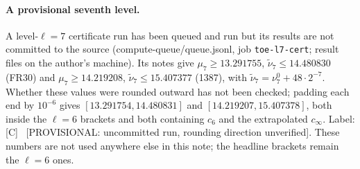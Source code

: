 \documentclass[11pt]{article}
\newcommand\pendingtag[1]{\ {\sffamily\scriptsize\textcolor{Mahogany}{[#1]}}}
\begin{document}
\paragraph{A provisional seventh level.} A level-$\ell=7$ certificate run has been queued and run but its results are not committed to the source (compute-queue/queue.jsonl, job \texttt{toe-l7-cert}; result files on the author's machine). Its notes give $\mu_7\ge13.291755$, $\tilde\nu_7\le14.480830$ (FR30) and $\mu_7\ge14.219208$, $\tilde\nu_7\le15.407377$ (1387), with $\tilde\nu_7=\nu^0_7+48\cdot2^{-7}$. Whether these values were rounded outward has not been checked; padding each end by $10^{-6}$ gives $[13.291754,14.480831]$ and $[14.219207,15.407378]$, both inside the $\ell=6$ brackets and both containing $c_6$ and the extrapolated $c_\infty$. Label: [C] \pendingtag{PROVISIONAL: uncommitted run, rounding direction unverified}. These numbers are not used anywhere else in this note; the headline brackets remain the $\ell=6$ ones.
\end{document}

